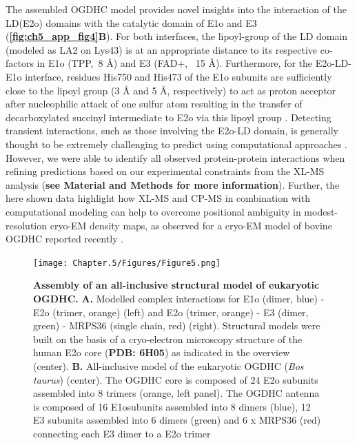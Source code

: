 The assembled OGDHC model provides novel insights into the interaction of the LD(E2o) domains with the catalytic domain of E1o and E3 (\textbf{\autoref{fig:ch5_app_fig4}B}). For both interfaces, the lipoyl-group of the LD domain (modeled as LA2 on Lys43) is at an appropriate distance to its respective co-factors in E1o (TPP,~8 Å) and E3 (FAD+, ~15 Å). Furthermore, for the E2o-LD-E1o interface, residues His750 and His473 of the E1o subunits are sufficiently close to the lipoyl group (3 Å and 5 Å, respectively) to act as proton acceptor after nucleophilic attack of one sulfur atom resulting in the transfer of decarboxylated succinyl intermediate to E2o via this lipoyl group \cite{Nemeria_2021, Pan_1998}. Detecting transient interactions, such as those involving the E2o-LD domain, is generally thought to be extremely challenging to predict using computational approaches \cite{Perrakis_2021}. However, we were able to identify all observed protein-protein interactions when refining predictions based on our experimental constraints from the XL-MS analysis (\textbf{see Material and Methods for more information}). Further, the here shown data highlight how XL-MS and CP-MS in combination with computational modeling can help to overcome positional ambiguity in modest-resolution cryo-EM density maps, as observed for a cryo-EM model of bovine OGDHC reported recently \cite{Liu_2022}.

\begin{figure}[htb!]
    \centering
    \texttt{[image: Chapter.5/Figures/Figure5.png]}
    \caption{\textbf{Assembly of an all-inclusive structural model of eukaryotic OGDHC.} \textbf{A.} Modelled complex interactions for E1o (dimer, blue) - E2o (trimer, orange) (left) and E2o (trimer, orange) - E3 (dimer, green) - MRPS36 (single chain, red) (right). Structural models were built on the basis of a cryo-electron microscopy structure of the human E2o core \cite{Nagy_2021} (\textbf{PDB: 6H05}) as indicated in the overview (center). \textbf{B.}  All-inclusive model of the eukaryotic OGDHC (\emph{Bos taurus}) (center). The OGDHC core is composed of 24 E2o subunits assembled into 8 trimers (orange, left panel). The OGDHC antenna is composed of 16 E1osubunits assembled into 8 dimers (blue), 12 E3 subunits assembled into 6 dimers (green) and 6 x MRPS36 (red) connecting each E3 dimer to a E2o trimer}
    \label{fig:ch5_fig5}
\end{figure}

%
